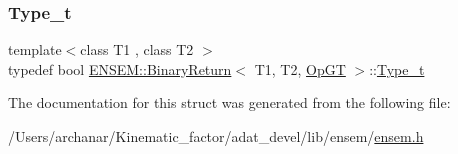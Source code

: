 \mbox{\label{structENSEM_1_1BinaryReturn_3_01T1_00_01T2_00_01OpGT_01_4_a421698302c7e07764108c7954de9f1c8}} 
\subsubsection{\texorpdfstring{Type\_t}{Type\_t}\hspace{0.1cm}{\footnotesize\ttfamily [2/2]}}
{\footnotesize\ttfamily template$<$class T1 , class T2 $>$ \\
typedef bool \mbox{\hyperlink{structENSEM_1_1BinaryReturn}{E\+N\+S\+E\+M\+::\+Binary\+Return}}$<$ T1, T2, \mbox{\hyperlink{structENSEM_1_1OpGT}{Op\+GT}} $>$\+::\mbox{\hyperlink{structENSEM_1_1BinaryReturn_3_01T1_00_01T2_00_01OpGT_01_4_a421698302c7e07764108c7954de9f1c8}{Type\+\_\+t}}}



The documentation for this struct was generated from the following file\+:\begin{DoxyCompactItemize}
\item 
/\+Users/archanar/\+Kinematic\+\_\+factor/adat\+\_\+devel/lib/ensem/\mbox{\hyperlink{lib_2ensem_2ensem_8h}{ensem.\+h}}\end{DoxyCompactItemize}
